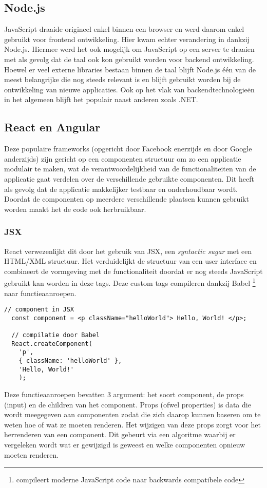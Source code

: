 \subsection{Node.js}
JavaScript draaide origineel enkel binnen een browser en werd daarom enkel gebruikt voor frontend ontwikkeling. Hier kwam echter verandering in dankzij Node.js. Hiermee werd het ook mogelijk om JavaScript op een server te draaien met als gevolg dat de taal ook kon gebruikt worden voor backend ontwikkeling. Hoewel er veel externe libraries bestaan binnen de taal blijft Node.js één van de meest belangrijke die nog steeds relevant is en blijft gebruikt worden bij de ontwikkeling van nieuwe applicaties. Ook op het vlak van backendtechnologieën in het algemeen blijft het populair naast anderen zoals .NET.

\subsection{React en Angular}
Deze populaire frameworks (opgericht door Facebook enerzijds en door Google anderzijds) zijn gericht op een componenten structuur om zo een applicatie modulair te maken, wat de verantwoordelijkheid van de functionaliteiten van de applicatie gaat verdelen over de verschillende gebruikte componenten. Dit heeft als gevolg dat de applicatie makkelijker testbaar en onderhoudbaar wordt. Doordat de componenten op meerdere verschillende plaatsen kunnen gebruikt worden maakt het de code ook herbruikbaar. 

\subsubsection{JSX}
React verwezenlijkt dit door het gebruik van JSX, een \textit{syntactic sugar} met een HTML/XML structuur. Het verduidelijkt de structuur van een user interface en combineert de vormgeving met de functionaliteit doordat er nog steeds JavaScript gebruikt kan worden in deze tags. Deze custom tags compileren dankzij Babel \footnote{compileert moderne JavaScript code naar backwards compatibele code} \autocite{Babel2019} naar functieaanroepen.
\begin{lstlisting}[caption=JSX compilatie]
  // component in JSX
  const component = <p className="helloWorld"> Hello, World! </p>;  

  // compilatie door Babel
  React.createComponent(
    'p',
    { className: 'helloWorld' },
    'Hello, World!'
    );
\end{lstlisting}
Deze functieaanroepen bevatten 3 argument: het soort component, de props (input) en de children van het component. Props (ofwel properties) is data die wordt meegegeven aan componenten zodat die zich daarop kunnen baseren om te weten hoe of wat ze moeten renderen. Het wijzigen van deze props zorgt voor het herrenderen van een component. Dit gebeurt via een algoritme waarbij er vergeleken wordt wat er gewijzigd is geweest en welke componenten opnieuw moeten renderen. 

